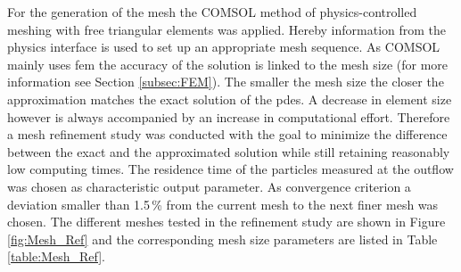 \begin{figure}[H]
\centering
{}
\end{figure}

For the generation of the mesh the COMSOL method of physics-controlled meshing with free triangular elements was applied. Hereby information from the physics interface is used to set up an appropriate mesh sequence. As COMSOL mainly uses \gls{fem} the accuracy of the solution is linked to the mesh size (for more information see Section \ref{subsec:FEM}). The smaller the mesh size the closer the approximation matches the exact solution of the \glspl{pde}. A decrease in element size however is always accompanied by an increase in computational effort. Therefore a mesh refinement study was conducted with the goal to minimize the difference between the exact and the approximated solution while still retaining reasonably low computing times. The residence time of the particles measured at the outflow was chosen as characteristic output parameter. As convergence criterion a deviation smaller than 1.5\,\% from the current mesh to the next finer mesh was chosen. The different meshes tested in the refinement study are shown in Figure \ref{fig:Mesh_Ref} and the corresponding mesh size parameters are listed in Table \ref{table:Mesh_Ref}.  

